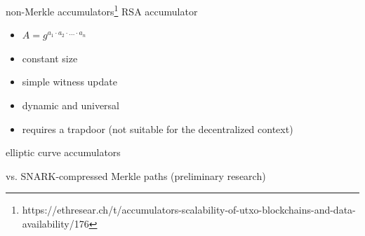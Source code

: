 \documentclass{beamer}
\begin{document}
\begin{frame}{non-Merkle accumulators\footnote{https://ethresear.ch/t/accumulators-scalability-of-utxo-blockchains-and-data-availability/176}}
RSA accumulator
\begin{itemize}
\item $A = g^{a_1 \cdot a_2 \cdot \ldots \cdot a_n}$
\item constant size
\item simple witness update
\item dynamic and universal
\item requires a trapdoor (not suitable for the decentralized context)
\end{itemize}
elliptic curve accumulators

vs. SNARK-compressed Merkle paths (preliminary research)
\end{frame}
\end{document}
